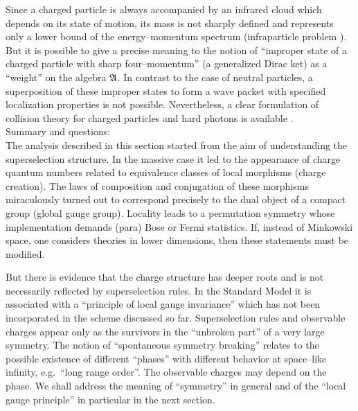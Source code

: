 Since a charged particle is always accompanied by an infrared cloud
which depends on its state of motion, its mass is not sharply 
defined and represents only a lower bound of the energy--momentum spectrum 
(infraparticle problem \cite{Sch,FrMoSt,Bu3}). But it is possible to
give a precise meaning to the notion of 
``improper state of a charged particle
with sharp four--momentum'' (a generalized Dirac ket) as a ``weight'' on the
algebra ${\mathfrak A}$. In contrast to the case of neutral particles, 
a superposition of these improper states to form 
a wave packet with specified localization properties
is not possible. Nevertheless, a clear formulation
of collision theory for charged particles and hard photons is
available \cite{BuPoSt}. \\[2mm]
{\noindent \subsect Summary and questions:} \\[2mm]
The analysis described in this section started from the aim of
understanding the superselection structure. In the massive case it
led to the appearance of charge quantum numbers related to
equivalence classes of local morphisms (charge creation). The
laws of composition and conjugation of these morphisms miraculously
turned out to correspond precisely to the dual object of a compact
group (global gauge group). Locality leads to a permutation symmetry
whose implementation demands (para) Bose or Fermi
statistics. If, instead of Minkowski space, one considers theories in
lower dimensions, then these statements must be modified.

But there is evidence that the charge structure has deeper roots and is
not necessarily reflected by superselection rules. In the Standard
Model it is associated with a ``principle of local gauge
invariance'' which has not been incorporated in the scheme discussed
so far. Superselection rules and observable charges appear only as
the survivors in the ``unbroken part'' of a very large symmetry. 
The notion of ``spontaneous symmetry breaking'' relates to
the possible existence of different ``phases'' with different behavior
at space--like infinity, e.g.\ ``long range order''.
The observable charges may depend on the phase. We shall address the
meaning of ``symmetry'' in general and of the ``local gauge
principle'' in particular in the next section.
